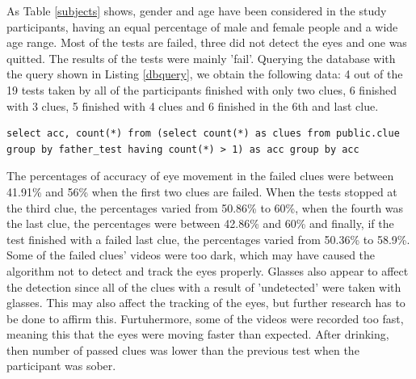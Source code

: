 As Table \ref{subjects} shows, gender and age have been considered in the study participants, having an equal percentage of male and female people and a wide age range. Most of the tests are failed, three did not detect the eyes and one was quitted. The results of the tests were mainly 'fail'. Querying the database with the query shown in Listing \ref{dbquery}, we obtain the following data: 4 out of the 19 tests taken by all of the participants finished with only two clues, 6 finished with 3 clues, 5 finished with 4 clues and 6 finished in the 6th and last clue.

\begin{lstlisting}[caption={SQL query used to group the tests by the number of clues taken}, captionpos=b, label={dbquery}]
select acc, count(*) from (select count(*) as clues from public.clue group by father_test having count(*) > 1) as acc group by acc
\end{lstlisting}

The percentages of accuracy of eye movement in the failed clues were between 41.91\% and 56\% when the first two clues are failed. When the tests stopped at the third clue, the percentages varied from 50.86\% to 60\%, when the fourth was the last clue, the percentages were between 42.86\% and 60\% and finally, if the test finished with a failed last clue, the percentages varied from 50.36\% to 58.9\%. Some of the failed clues' videos were too dark, which may have caused the algorithm not to detect and track the eyes properly. Glasses also appear to affect the detection since all of the clues with a result of 'undetected' were taken with glasses. This may also affect the tracking of the eyes, but further research has to be done to affirm this. Furtuhermore, some of the videos were recorded too fast, meaning this that the eyes were moving faster than expected. After drinking, then number of passed clues was lower than the previous test when the participant was sober.
